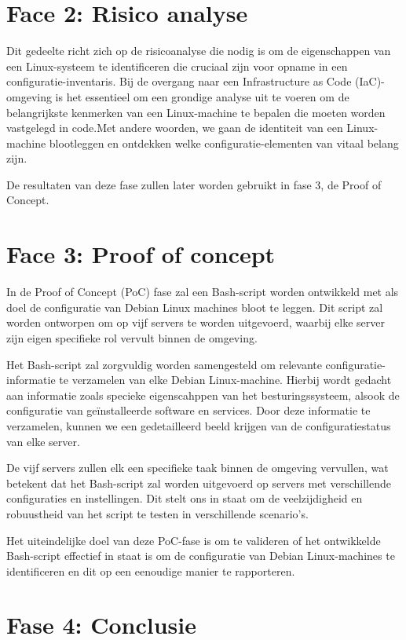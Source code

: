 \section{Face 2: Risico analyse}
\label{fase-2-risico-analyse}

Dit gedeelte richt zich op de risicoanalyse die nodig is om de eigenschappen van een Linux-systeem te identificeren die cruciaal zijn voor opname in een configuratie-inventaris.
Bij de overgang naar een Infrastructure as Code (IaC)-omgeving is het essentieel om een grondige analyse uit te voeren om de belangrijkste kenmerken van een Linux-machine te bepalen die moeten worden vastgelegd in code.Met andere woorden, we gaan de identiteit van een Linux-machine blootleggen en ontdekken welke configuratie-elementen van vitaal belang zijn.

De resultaten van deze fase zullen later worden gebruikt in fase 3, de Proof of Concept.

\section{Face 3: Proof of concept}
\label{face-3-proof-of-concept}

In de Proof of Concept (PoC) fase zal een Bash-script worden ontwikkeld met als doel de configuratie van Debian Linux machines bloot te leggen.
Dit script zal worden ontworpen om op vijf servers te worden uitgevoerd, waarbij elke server zijn eigen specifieke rol vervult binnen de omgeving.

Het Bash-script zal zorgvuldig worden samengesteld om relevante configuratie-informatie te verzamelen van elke Debian Linux-machine.
Hierbij wordt gedacht aan informatie zoals specieke eigenscahppen van het besturingssysteem, alsook de configuratie van ge\"installeerde software en services.
Door deze informatie te verzamelen, kunnen we een gedetailleerd beeld krijgen van de configuratiestatus van elke server.

De vijf servers zullen elk een specifieke taak binnen de omgeving vervullen, wat betekent dat het Bash-script zal worden uitgevoerd op servers met verschillende configuraties en instellingen.
Dit stelt ons in staat om de veelzijdigheid en robuustheid van het script te testen in verschillende scenario's.

Het uiteindelijke doel van deze PoC-fase is om te valideren of het ontwikkelde Bash-script effectief in staat is om de configuratie van Debian Linux-machines te identificeren en dit op een eenoudige manier te rapporteren.

\section{Fase 4: Conclusie}
\label{fas-4-conclusie}
